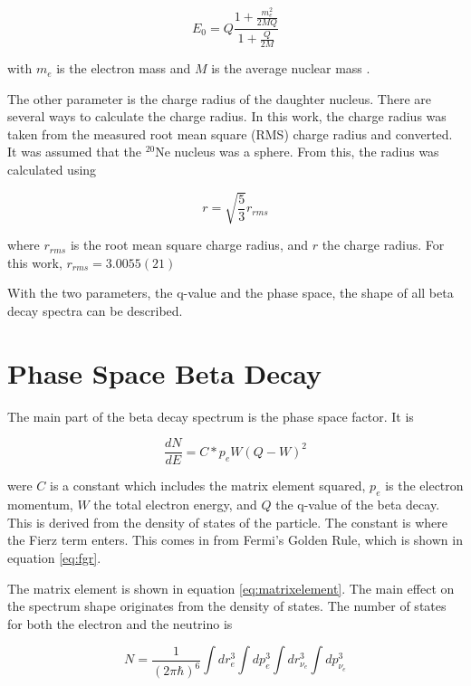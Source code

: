 \documentclass[../MaxHughesThesis.tex]{subfiles}
\begin{document}
\begin{equation}
	E_{0} = Q\frac{1 + \frac{m_{e}^{2}}{2MQ}}{1 + \frac{Q}{2M}} 
	\label{eq:recoilqval}
\end{equation} 

with $m_{e}$ is the electron mass and $M$ is the average nuclear mass \cite{Hol74}.

The other parameter is the charge radius of the daughter nucleus.
There are several ways to calculate the charge radius.
In this work, the charge radius was taken from the measured root mean square (RMS) charge radius and converted.
It was assumed that the $^{20}$Ne nucleus was a sphere. 
From this, the radius was calculated using %

\begin{equation}
	r = \sqrt{\frac{5}{3}}r_{rms}	
	\label{eq:sphereeq}
\end{equation}

where $r_{rms}$ is the root mean square charge radius, and $r$ the charge radius.
For this work, $r_{rms} = 3.0055 (21)$ \cite{Ang13}

With the two parameters, the q-value and the phase space, the shape of all beta decay spectra can be described.

\section{Phase Space Beta Decay}
The main part of the beta decay spectrum is the phase space factor.
It is %

\begin{equation}
	\frac{dN}{dE} = C * p_{e}W(Q - W)^{2}
	\label{eq:phase_space}
\end{equation}

were $C$ is a constant which includes the matrix element squared, $p_{e}$ is the electron momentum, $W$ the total electron energy, and $Q$ the q-value of the beta decay.
This is derived from the density of states of the particle.
The constant is where the Fierz term enters. 
This comes in from Fermi's Golden Rule, which is shown in equation \ref{eq:fgr}.

The matrix element is shown in equation \ref{eq:matrixelement}.
The main effect on the spectrum shape originates from the density of states.
The number of states for both the electron and the neutrino is %

\begin{equation}
	N = \frac{1}{(2\pi\hbar)^{6}}\int dr^{3}_{e} \int dp^{3}_{e}\int dr^{3}_{\nu_{e}} \int dp^{3}_{\nu_{e}} 
	\label{eq:densityofstates}
\end{equation}
\end{document}
